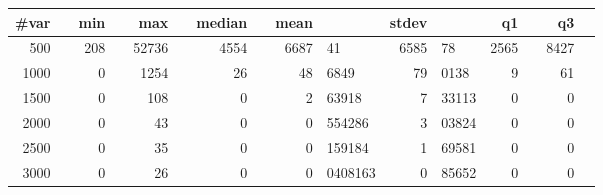 \begin{tabular}{r@{.}lr@{.}lr@{.}lr@{.}lr@{.}lr@{.}lr@{.}lr@{.}l}
\toprule
\textbf{\#var}&	&\textbf{min}&	&\textbf{max}&	&\textbf{median}&	&\textbf{mean}&	&\textbf{stdev}&	&\textbf{q1}&	&\textbf{q3}&\\\midrule
500&	&208&	&52736&	&4554&	&6687&41	&6585&78	&2565&	&8427&\\
1000&	&0&	&1254&	&26&	&48&6849	&79&0138	&9&	&61&\\
1500&	&0&	&108&	&0&	&2&63918	&7&33113	&0&	&0&\\
2000&	&0&	&43&	&0&	&0&554286	&3&03824	&0&	&0&\\
2500&	&0&	&35&	&0&	&0&159184	&1&69581	&0&	&0&\\
3000&	&0&	&26&	&0&	&0&0408163	&0&85652	&0&	&0&\\
\bottomrule
\end{tabular}